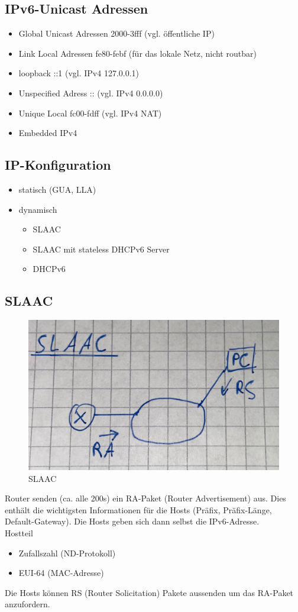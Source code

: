 \subsection*{IPv6-Unicast Adressen}
\begin{itemize}
	\item Global Unicast Adressen 2000-3fff (vgl. öffentliche IP)
	\item Link Local Adressen fe80-febf (für das lokale Netz, nicht routbar)
	\item loopback ::1 (vgl. IPv4 127.0.0.1)
	\item Unspecified Adress :: (vgl. IPv4 0.0.0.0)
	\item Unique Local fc00-fdff (vgl. IPv4 NAT)
	\item Embedded IPv4
\end{itemize}

\subsection*{IP-Konfiguration}
\begin{itemize}
	\item statisch (GUA, LLA)
	\item dynamisch
	\begin{itemize}
		\item SLAAC
		\item SLAAC mit stateless DHCPv6 Server
		\item DHCPv6
	\end{itemize}
\end{itemize}

\subsection*{SLAAC}
\begin{figure}[H]
	\centering
	\includegraphics[width=0.8\linewidth]{figures/slaac.jpeg}
	\caption{SLAAC}
\end{figure}
Router senden (ca. alle 200s) ein RA-Paket (Router Advertisement) aus. Dies enthält die wichtigsten Informationen für die Hosts (Präfix, Präfix-Länge, Default-Gateway). Die Hosts geben sich dann selbst die IPv6-Adresse. \\
Hostteil
\begin{itemize}
	\item Zufallszahl (ND-Protokoll)
	\item EUI-64 (MAC-Adresse)
\end{itemize}
Die Hosts können RS (Router Solicitation) Pakete aussenden um das RA-Paket anzufordern.



